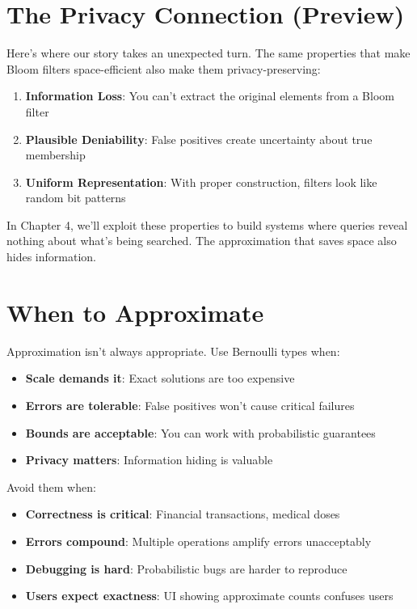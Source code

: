 \section{The Privacy Connection (Preview)}

Here's where our story takes an unexpected turn. The same properties that make Bloom filters space-efficient also make them privacy-preserving:

\begin{enumerate}
\item \textbf{Information Loss}: You can't extract the original elements from a Bloom filter
\item \textbf{Plausible Deniability}: False positives create uncertainty about true membership
\item \textbf{Uniform Representation}: With proper construction, filters look like random bit patterns
\end{enumerate}

In Chapter 4, we'll exploit these properties to build systems where queries reveal nothing about what's being searched. The approximation that saves space also hides information.

\section{When to Approximate}

Approximation isn't always appropriate. Use Bernoulli types when:

\begin{itemize}
\item \textbf{Scale demands it}: Exact solutions are too expensive
\item \textbf{Errors are tolerable}: False positives won't cause critical failures
\item \textbf{Bounds are acceptable}: You can work with probabilistic guarantees
\item \textbf{Privacy matters}: Information hiding is valuable
\end{itemize}

Avoid them when:
\begin{itemize}
\item \textbf{Correctness is critical}: Financial transactions, medical doses
\item \textbf{Errors compound}: Multiple operations amplify errors unacceptably
\item \textbf{Debugging is hard}: Probabilistic bugs are harder to reproduce
\item \textbf{Users expect exactness}: UI showing approximate counts confuses users
\end{itemize}

